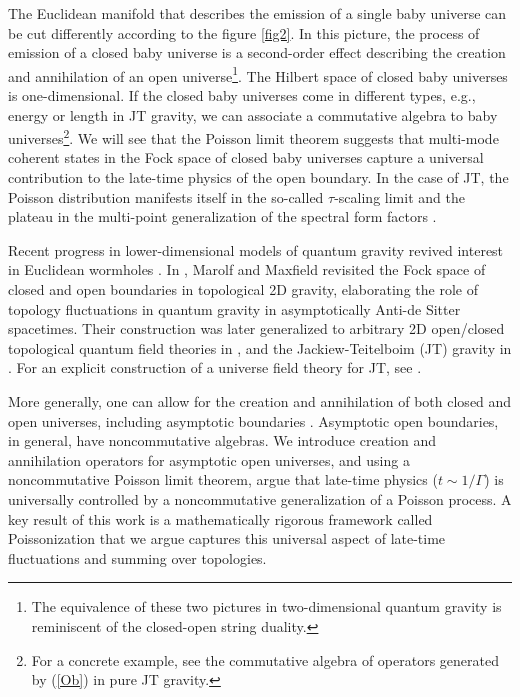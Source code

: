 \documentclass[a4paper,11pt]{article}
\theoremstyle{definition}
\numberwithin{equation}{section}
\newcommand{\NL}[1]{\textcolor{blue}{#1}}
\begin{document}
The Euclidean manifold that describes the emission of a single baby universe can be cut differently according to the figure \ref{fig2}. In this picture, the process of emission of a closed baby universe is a second-order effect describing the creation and annihilation of an open universe\footnote{The equivalence of these two pictures in two-dimensional quantum gravity is reminiscent of the closed-open string duality.}. The Hilbert space of closed baby universes is one-dimensional. If the closed baby universes come in different types, e.g., energy or length in JT gravity, we can associate a commutative algebra to baby universes\footnote{For a concrete example, see the commutative algebra of operators generated by (\ref{Ob}) in pure JT gravity.}. We will see that the Poisson limit theorem suggests that multi-mode coherent states in the Fock space of closed baby universes capture a universal contribution to the late-time physics of the open boundary. In the case of JT, the Poisson distribution manifests itself in the so-called $\tau$-scaling limit and the plateau in the multi-point generalization of the spectral form factors \cite{okuyama2020multi,blommaert2023integrable,saad2024convergent}. 


Recent progress in lower-dimensional models of quantum gravity revived interest in Euclidean wormholes \cite{saad2019jt}. In \cite{MM}, Marolf and Maxfield revisited the Fock space of closed and open boundaries in topological 2D gravity, elaborating the role of topology fluctuations in quantum gravity in asymptotically Anti-de Sitter spacetimes. 
Their construction was later generalized to arbitrary 2D open/closed topological quantum field theories in \cite{gardiner20212D,@Banerjee-Moore}, and the Jackiew-Teitelboim (JT) gravity in \cite{penington2023algebras}. For an explicit construction of a universe field theory for JT, see \cite{post2022universe}.


More generally, one can allow for the creation and annihilation of both closed and open universes, including asymptotic boundaries \cite{penington2023algebras}. Asymptotic open boundaries, in general, have noncommutative algebras. We introduce creation and annihilation operators for asymptotic open universes, and using a noncommutative Poisson limit theorem, argue that late-time physics ($t\sim 1/\Gamma$) is universally controlled by a noncommutative generalization of a Poisson process. A key result of this work is a mathematically rigorous framework called Poissonization that we argue captures this universal aspect of late-time fluctuations and summing over topologies.
\end{document}
